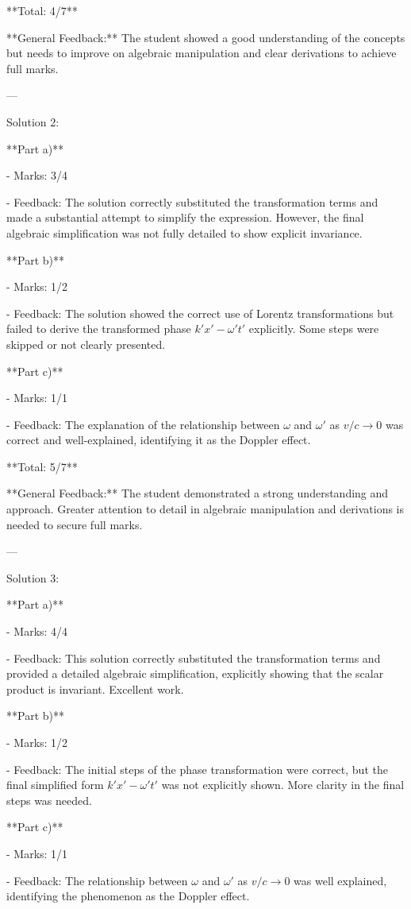 \documentclass[a4paper,11pt]{article}
\begin{document}
**Total: 4/7**

**General Feedback:** The student showed a good understanding of the concepts but needs to improve on algebraic manipulation and clear derivations to achieve full marks.

---

Solution 2:

**Part a)**

- Marks: 3/4

- Feedback: The solution correctly substituted the transformation terms and made a substantial attempt to simplify the expression. However, the final algebraic simplification was not fully detailed to show explicit invariance.

**Part b)**

- Marks: 1/2

- Feedback: The solution showed the correct use of Lorentz transformations but failed to derive the transformed phase \( k'x' - \omega' t' \) explicitly. Some steps were skipped or not clearly presented.

**Part c)**

- Marks: 1/1

- Feedback: The explanation of the relationship between \( \omega \) and \( \omega' \) as \( v/c \to 0 \) was correct and well-explained, identifying it as the Doppler effect.

**Total: 5/7**

**General Feedback:** The student demonstrated a strong understanding and approach. Greater attention to detail in algebraic manipulation and derivations is needed to secure full marks.

---

Solution 3:

**Part a)**

- Marks: 4/4

- Feedback: This solution correctly substituted the transformation terms and provided a detailed algebraic simplification, explicitly showing that the scalar product is invariant. Excellent work.

**Part b)**

- Marks: 1/2

- Feedback: The initial steps of the phase transformation were correct, but the final simplified form \( k'x' - \omega' t' \) was not explicitly shown. More clarity in the final steps was needed.

**Part c)**

- Marks: 1/1

- Feedback: The relationship between \( \omega \) and \( \omega' \) as \( v/c \to 0 \) was well explained, identifying the phenomenon as the Doppler effect.
\end{document}
